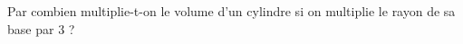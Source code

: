 
\begin{exercice}\label{exoSeconde-0093}

    Par combien multiplie-t-on le volume d'un cylindre si on multiplie le rayon de sa base par \( 3\) ?

\end{exercice}
